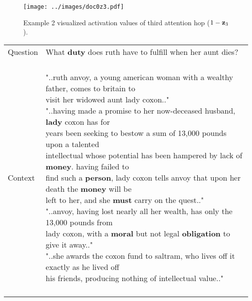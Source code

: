 \documentclass[11pt,a4paper]{article}
\begin{document}
\begin{figure*}[h]
  \centering
  \texttt{[image: ../images/doc0z3.pdf]}
 \caption{Example 2 visualized activation values of third attention hop ($1 - {\bf z}_3$).}
\end{figure*} \begin{table*}[!h]
	\centering
    \begin{small}
  \begin{tabular}{|p{}|p{}|} 
    \hline
    Question & \makecell[l]{What \textbf{duty} does ruth have to fulfill when her aunt dies?\\} \\
    Context &  \makecell[l]{\\"..ruth anvoy, a young american woman with a wealthy father, comes to britain to \\ visit her widowed aunt lady coxon.."\\
"..having made a promise to her now-deceased husband, \textbf{lady} coxon has for \\ years been seeking to bestow a sum of 13,000 pounds upon a talented \\ intellectual whose potential has been hampered by lack of \textbf{money}. having failed to \\ find such a \textbf{person}, lady coxon tells anvoy that upon her death the \textbf{money} will be \\ left to her, and she \textbf{must} carry on the  quest.."\\
"..anvoy, having lost nearly all her wealth, has only the 13,000 pounds from \\ lady coxon, with a \textbf{moral} but not legal \textbf{obligation} to give it away.."\\
"..she awards the coxon fund to saltram, who lives off it exactly as he lived off \\ his friends, producing nothing of intellectual value.."\\ \\}  \\


\end{tabular}
\end{small}
\end{table*}
\end{document}

